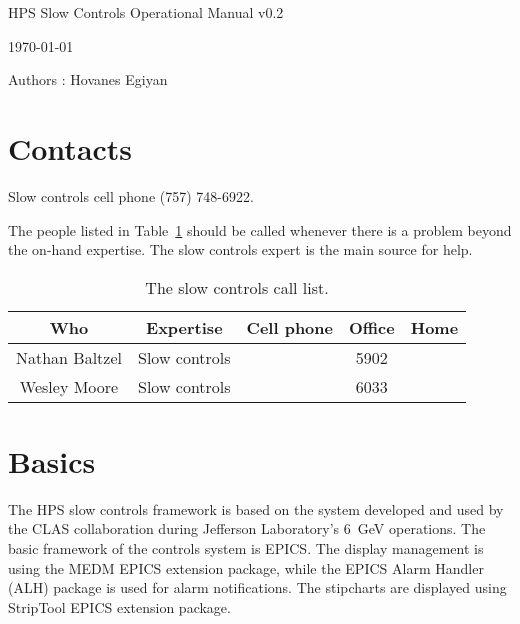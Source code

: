 \documentclass[letter,10pt]{article}
\begin{document}
\begin{center}
\Large HPS Slow Controls Operational Manual v0.2

\today

\normalsize Authors : Hovanes Egiyan\\

\end{center}

\section{Contacts}
Slow controls cell phone  (757) 748-6922. \newline 

The people listed in Table~\ref{tab:controls_contact} should be called whenever there is a problem beyond the on-hand
expertise. The slow controls expert is the main source for help.
\begin{table}[h]
\begin{center}
\begin{tabular}{|c|c|c|c|c|}   \hline
	  Who 			& Expertise		&  Cell phone	&   Office  	&		Home    \\  \hline
\hline
         Nathan Baltzel		& Slow controls		&		&  5902		& 			\\  \hline 
         Wesley Moore		& Slow controls		&		&  6033		& 			\\  \hline          
\end{tabular}
\end{center}
\caption{The slow controls call list.}
\label{tab:controls_contact}
\end{table}


\section{Basics}
The HPS slow controls framework is based on the system developed and used by the CLAS collaboration during Jefferson Laboratory's 6~GeV 
operations. The basic framework of the controls system is EPICS. The display management is using the MEDM EPICS extension package, 
while the EPICS Alarm Handler (ALH) package is used for alarm notifications. The stipcharts are displayed using StripTool EPICS extension package. 
\end{document}
